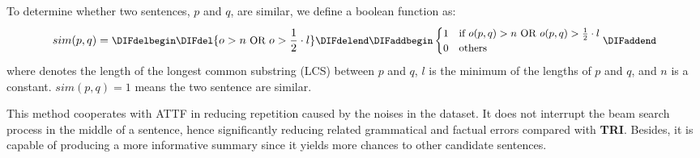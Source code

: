 To determine whether two sentences, 
$p$ and $q$, are similar, we define a boolean function as:
\begin{equation}\label{eq:s}
\small
	sim(p,q) = 
	\DIFdelbegin \DIFdel{o > n\text{ OR }o > \frac{1}{2}\cdot l
}\DIFdelend \DIFaddbegin \begin{cases}
		   1 &\mbox{if $o(p,q) > n\text{ OR }o(p,q) > \frac{1}{2}\cdot l$}\\
		   0 &\mbox{others}
   \end{cases}
\DIFaddend \end{equation}
where \DIFdelbegin {}\DIFdelend \DIFaddbegin {}\DIFaddend denotes the length of 
the longest common substring (LCS) between $p$ and $q$, 
$l$ is the minimum of the lengths of $p$ and $q$, and $n$ is a constant. 
$sim(p,q)=1$ means the two sentence are similar.

This method cooperates with ATTF in 
reducing repetition caused by the noises in the dataset.
It does not interrupt the beam search process in the middle of a sentence, 
hence significantly reducing related grammatical and factual errors 
compared with \textbf{TRI}.
Besides, it is capable of producing a more informative summary since
it yields more chances to other candidate sentences.
